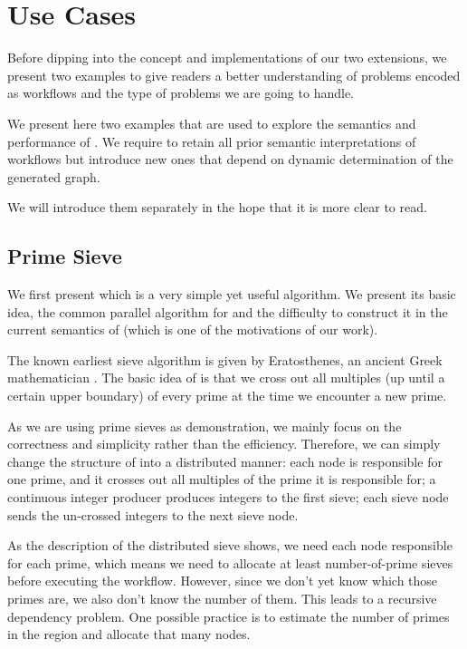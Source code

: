 \chapter{Use Cases}
Before dipping into the concept and implementations of our two extensions, we present two examples to give readers a better understanding of problems encoded as workflows and the type of problems we are going to handle.

We present here two examples that are used to explore the semantics and performance of \dpy. We require to retain all prior semantic interpretations of workflows but introduce new ones that depend on dynamic determination of the generated graph.

We will introduce them separately in the hope that it is more clear to read.

\section{Prime Sieve} \label{sec:uc_sieve}
We first present \ttsieve which is a very simple yet useful algorithm. We present its basic idea, the common parallel algorithm for \ttsieve and the difficulty to construct it in the current semantics of \dpy (which is one of the motivations of our work).

The known earliest sieve algorithm is \ttesieve given by Eratosthenes, an ancient Greek mathematician \cite{o2009genuine}. The basic idea of \ttesieve is that we cross out all multiples (up until a certain upper boundary) of every prime at the time we encounter a new prime.

As we are using prime sieves as demonstration, we mainly focus on the correctness and simplicity rather than the efficiency. Therefore, we can simply change the structure of \ttesieve into a distributed manner: each node is responsible for one prime, and it crosses out all multiples of the prime it is responsible for; a continuous integer producer produces integers to the first sieve; each sieve node sends the un-crossed integers to the next sieve node.

As the description of the distributed sieve shows, we need each node responsible for each prime, which means we need to allocate at least number-of-prime sieves before executing the workflow. However, since we don't yet know which those primes are, we also don't know the number of them. This leads to a recursive dependency problem. One possible practice is to estimate the number of primes in the region and allocate that many nodes.

